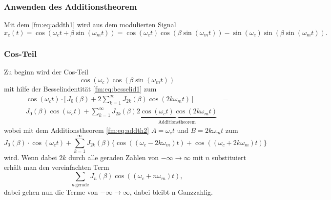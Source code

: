 \subsubsection{Anwenden des Additionstheorem}
Mit dem \eqref{fm:eq:addth1} wird aus dem modulierten Signal
\[
    x_c(t) 
    =
    \cos(\omega_c t + \beta\sin(\omega_mt))
    =
    \cos(\omega_c t)\cos(\beta\sin(\omega_m t))-\sin(\omega_c)\sin(\beta\sin(\omega_m t)).
    \label{fm:eq:start}
\]
\subsubsection{Cos-Teil}
Zu beginn wird der Cos-Teil
\[
    \cos(\omega_c)\cos(\beta\sin(\omega_mt))  
\]
mit hilfe der Besselindentität \eqref{fm:eq:besselid1} zum
\begin{align*}
    \cos(\omega_c t) \cdot \bigg[\, J_0(\beta) + 2\sum_{k=1}^\infty J_{2k}(\beta) \cos( 2k \omega_m t)\, \bigg]
    &=\\
    J_0(\beta)\cos(\omega_c t) + \sum_{k=1}^\infty J_{2k}(\beta) 
    \underbrace{2\cos(\omega_c t)\cos(2k\omega_m t)}_{\text{Additionstheorem}}
\end{align*}
wobei mit dem Additionstheorem \eqref{fm:eq:addth2} \(A = \omega_c t\) und \(B = 2k\omega_m t \) zum
\[
    J_0(\beta)\cdot \cos(\omega_c t) + \sum_{k=1}^\infty J_{2k}(\beta) \{ \cos((\omega_c - 2k \omega_m) t)+\cos((\omega_c + 2k \omega_m) t) \}
\]
wird.
Wenn dabei \(2k\) durch alle geraden Zahlen von \(-\infty \to \infty\) mit \(n\) substituiert erhält man den vereinfachten Term
\[
    \sum_{n\, \text{gerade}} J_{n}(\beta) \cos((\omega_c + n\omega_m) t),
    \label{fm:eq:gerade}
\]
dabei gehen nun die Terme von \(-\infty \to \infty\), dabei bleibt n Ganzzahlig.

